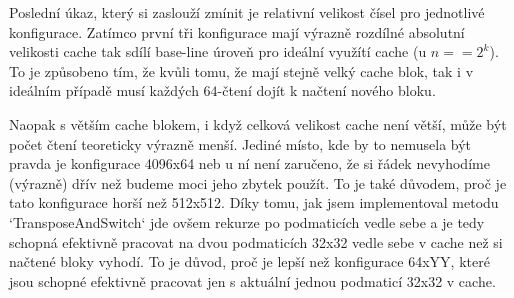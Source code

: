 \documentclass[12pt,a4paper]{report}
\begin{document}
	Poslední úkaz, který si zaslouží zmínit je relativní velikost čísel pro jednotlivé konfigurace. Zatímco první tři konfigurace mají výrazně rozdílné absolutní velikosti cache tak sdílí base-line úroveň pro ideální využítí cache (u $n == 2^k$). To je způsobeno tím, že kvůli tomu, že mají stejně velký cache blok, tak i v ideálním případě musí každých $64$-čtení dojít k načtení nového bloku.
	
	Naopak s větším cache blokem, i když celková velikost cache není větší, může být počet čtení teoreticky výrazně menší. Jediné místo, kde by to nemusela být pravda je konfigurace 4096x64 neb u ní není zaručeno, že si řádek nevyhodíme (výrazně) dřív než budeme moci jeho zbytek použít. To je také důvodem, proč je tato konfigurace horší než 512x512. Díky tomu, jak jsem implementoval metodu `TransposeAndSwitch` jde ovšem rekurze po podmaticích vedle sebe a je tedy schopná efektivně pracovat na dvou podmaticích 32x32 vedle sebe v cache než si načtené bloky vyhodí. To je důvod, proč je lepší než konfigurace 64xYY, které jsou schopné efektivně pracovat jen s aktuální jednou podmaticí 32x32 v cache.
\end{document}
